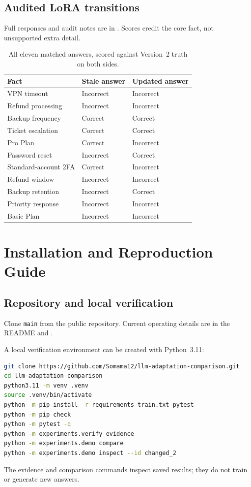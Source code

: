 \documentclass[11pt,letterpaper,oneside]{report}
\begin{document}
\section{Audited LoRA transitions}
Full responses and audit notes are in . Scores credit the core fact, not unsupported extra detail.
\begin{table}[H]\centering\small
\caption{All eleven matched answers, scored against Version~2 truth on both sides.}
\begin{tabularx}{\linewidth}{Lll}\toprule
Fact & Stale answer & Updated answer\\\midrule
VPN timeout & Incorrect & Incorrect\\
Refund processing & Incorrect & Incorrect\\
Backup frequency & Correct & Correct\\
Ticket escalation & Correct & Correct\\
Pro Plan & Correct & Incorrect\\
Password reset & Incorrect & Correct\\
Standard-account 2FA & Correct & Incorrect\\
Refund window & Incorrect & Incorrect\\
Backup retention & Incorrect & Correct\\
Priority response & Incorrect & Incorrect\\
Basic Plan & Incorrect & Incorrect\\\bottomrule
\end{tabularx}
\end{table}


\chapter{Installation and Reproduction Guide}
\section{Repository and local verification}
Clone \texttt{main} from the public repository. Current operating details are in the README and .

A local verification environment can be created with Python~3.11:
\begin{lstlisting}[language=bash]
git clone https://github.com/Somama12/llm-adaptation-comparison.git
cd llm-adaptation-comparison
python3.11 -m venv .venv
source .venv/bin/activate
python -m pip install -r requirements-train.txt pytest
python -m pip check
python -m pytest -q
python -m experiments.verify_evidence
python -m experiments.demo compare
python -m experiments.demo inspect --id changed_2
\end{lstlisting}
The evidence and comparison commands inspect saved results; they do not train or generate new answers.
\end{document}
